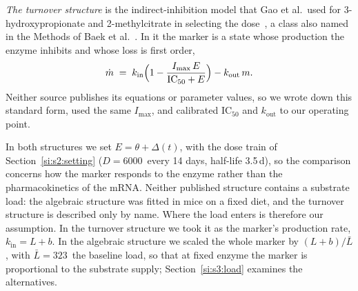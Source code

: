 \emph{The turnover structure} is the indirect-inhibition model that Gao et al.\ used for
3-hydroxy\-propionate and 2-methyl\-citrate in selecting the dose~\cite{gao2025acop}, a class also
named in the Methods of Baek et al.~\cite{mrna_moa}. In it the marker is a state whose
production the enzyme inhibits and whose loss is first order,
\begin{equation}
\label{seq:turnover}
\dot m \;=\; k_{\mathrm{in}}\Bigl(1-\frac{I_{\max}\,E}{\mathrm{IC}_{50}+E}\Bigr)-k_{\mathrm{out}}\,m .
\end{equation}
Neither source publishes its equations or parameter values, so we wrote down this standard form,
used the same $I_{\max}$, and calibrated $\mathrm{IC}_{50}$ and $k_{\mathrm{out}}$ to our operating
point.

In both structures we set $E=\theta+\Delta(t)$, with the dose train of Section~\ref{si:s2:setting}
($D=6000$\um\ every 14 days, half-life 3.5\,d), so the comparison concerns how the marker
responds to the enzyme rather than the pharmacokinetics of the mRNA. Neither published structure
contains a substrate load: the algebraic structure was fitted in mice on a fixed diet, and the
turnover structure is described only by name. Where the load enters is therefore our assumption.
In the turnover structure we took it as the marker's production rate, $k_{\mathrm{in}}=L+b$. In the
algebraic structure we scaled the whole marker by $(L+b)/\bar L$, with $\bar L=323$\um\ the
baseline load, so that at fixed enzyme the marker is proportional to the substrate supply;
Section~\ref{si:s3:load} examines the alternatives.

